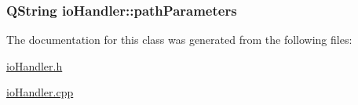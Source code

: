 \hypertarget{classio_handler_a18b3ace510b075e81a08a4a3ed9d00a2}{
\subsubsection[{path\+Parameters}]{\setlength{\rightskip}{0pt plus 5cm}Q\+String io\+Handler\+::path\+Parameters}}\label{classio_handler_a18b3ace510b075e81a08a4a3ed9d00a2}


The documentation for this class was generated from the following files\+:\begin{DoxyCompactItemize}
\item 
\hyperlink{io_handler_8h}{io\+Handler.\+h}\item 
\hyperlink{io_handler_8cpp}{io\+Handler.\+cpp}\end{DoxyCompactItemize}
